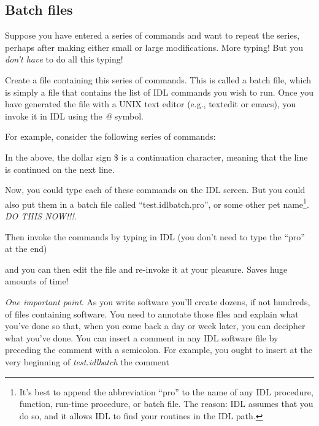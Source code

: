 \documentclass[psfig,preprint]{aastex}
\begin{document}
\subsection {Batch files}

        Suppose you have entered a series of commands and want to repeat
the series, perhaps after making either small or large modifications.
More typing! But you {\it don't have} to do all this typing!

	Create a file containing this series of commands.  This is
called a batch file, which is simply a file that contains the list of
IDL commands you wish to run.  Once you have generated the file with a
UNIX text editor (e.g., textedit or emacs), you invoke it in IDL using
the {\it @} symbol. 

        For example, consider the following series of commands:






\noindent In the above, the dollar sign \$ is a continuation character,
meaning that the line is continued on the next line. 

	Now, you could type each of these commands on the IDL screen. 
But you could also put them in a batch file called ``test.idlbatch.pro'', or
some other pet name\footnote{It's best to append the abbreviation
  ``pro'' to the name of any IDL procedure, function, run-time
  procedure, or batch file. The reason: IDL assumes that you do so, and
  it allows IDL to find your routines in the IDL path.}. {\it DO THIS NOW!!!}.

	Then invoke the commands by typing in IDL (you don't need to
	type the ``pro'' at the end)


\noindent and you can then edit the file and re-invoke it at your
pleasure. Saves huge amounts of time!

        {\it One important point}.  As you write software you'll create
dozens, if not hundreds, of files containing software. You need to
annotate those files and explain what you've done so that, when you
come back a day or week later, you can decipher what you've done. You
can insert a comment in any IDL software file by preceding the comment
with a semicolon. For example, you ought to insert at the very beginning
of {\it test.idlbatch} the comment
\end{document}
